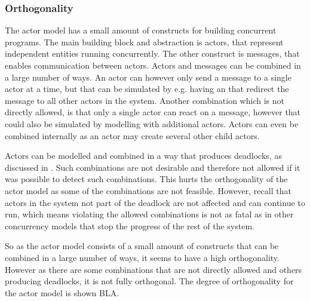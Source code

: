\subsubsection{Orthogonality}\label{sec:actor_orthogonality}
The actor model has a small amount of constructs for building concurrent programs. The main building block and abstraction is actors, that represent independent entities running concurrently. The other construct is messages, that enables communication between actors. Actors and messages can be combined in a large number of ways. An actor can however only send a message to a single actor at a time, but that can be simulated by e.g. having an  that redirect the message to all other actors in the system. Another combination which is not directly allowed, is that only a single actor can react on a message, however that could also be simulated by modelling with additional actors. Actors can even be combined internally as an actor may create several other child actors.

Actors can be modelled and combined in a way that produces deadlocks, as discussed in . Such combinations are not desirable and therefore not allowed if it was possible to detect such combinations. This hurts the orthogonality of the actor model as some of the combinations are not feasible. However, recall that actors in the system not part of the deadlock are not affected and can continue to run, which means violating the allowed combinations is not as fatal as in other concurrency models that stop the progress of the rest of the system.

So as the actor model consists of a small amount of constructs that can be combined in a large number of ways, it seems to have a high orthogonality. However as there are some combinations that are not directly allowed and others producing deadlocks, it is not fully orthogonal. The degree of orthogonality for the actor model is shown BLA.


